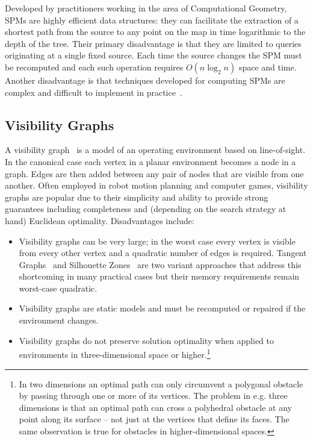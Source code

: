 Developed by practitioners working in the area of Computational Geometry, SPMs
are highly efficient data structures: they can facilitate the extraction
of a shortest path from the source to any point on the map in time logarithmic to
the depth of the tree.
Their primary disadvantage is that they are limited to queries originating at
a single fixed source. Each time the source changes the SPM must be recomputed and
each such operation requires $O(n\log_2{n})$ space and time. 
Another disadvantage is that techniques developed for computing SPMs are complex 
and difficult to implement in practice~\citep{surazhsky05}. 

\subsection{Visibility Graphs}
\label{cha::lit::graphs::vis}
A visibility graph~\citep{lozanoperez79} is a model of an operating environment based on
line-of-sight.  In the canonical case each vertex in a planar environment
becomes a node in a graph. Edges are then added between any pair of nodes that
are visible from one another.  Often employed in robot
motion planning and computer games, visibility graphs are popular due to their 
simplicity and ability to provide strong guarantees including completeness and 
(depending on the search strategy at hand) Euclidean optimality. Disadvantages 
include:
\begin{itemize}
\item Visibility graphs can be very large; in the worst case every
vertex is visible from every other vertex and a quadratic number
of edges is required. Tangent Graphs~\citep{liu92} and Silhouette Zones~\citep{young01b}
are two variant approaches that address this shortcoming in many practical
cases but their memory requirements remain worst-case quadratic.
\item Visibility graphs are static models and must be recomputed or 
repaired if the environment changes.
\item Visibility graphs do not preserve solution optimality when applied
to environments in three-dimensional space or higher.\footnote{
In two dimensions an optimal path can only circumvent a polygonal 
obstacle by passing through one or more of its vertices.
The problem in e.g. three dimensions is that an optimal path can cross 
a polyhedral obstacle at any point along its surface -- not just at the vertices
that define its faces. The same observation 
is true for obstacles in higher-dimensional spaces.}
\end{itemize}

